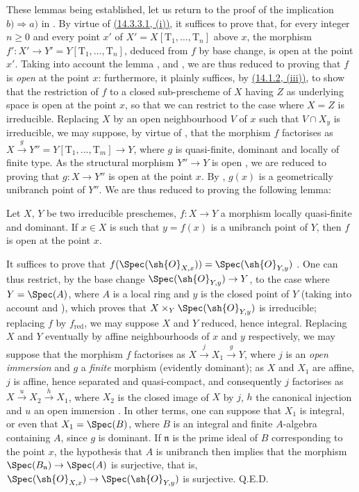 These lemmas being established, let us return to the proof of the implication $b)\Rightarrow a)$ in .
By virtue of \hyperref[IV.14.3.3.1]{(14.3.3.1, (i))}, it suffices to prove that, for every integer $n\geq 0$ and every point $x'$ of $X'=X[\mathrm{T}_1,\ldots,\mathrm{T}_n]$ above $x$, the morphism
$f':X'\to Y'=Y[\mathrm{T}_1,\ldots,\mathrm{T}_n]$, deduced from $f$ by base change, is open at the point $x'$.
Taking into account the lemma ,  and , we are thus reduced to proving that $f$ is \emph{open} at the point $x$: furthermore, it plainly suffices, by \hyperref[IV.14.1.2]{(14.1.2, (iii))}, to show that the restriction of $f$ to a closed sub-prescheme of $X$ having $Z$ as underlying space is open at the point $x$, so that we can restrict to the case where $X=Z$ is irreducible.
Replacing $X$ by an open neighbourhood $V$ of $x$ such that $V\cap X_y$ is irreducible, we may suppose, by virtue of , that the morphism $f$ factorises as $X\xrightarrow{g}Y''=Y[\mathrm{T}_1,\ldots,\mathrm{T}_m]\to Y$, where $g$ is quasi-finite, dominant and locally of finite type.
As the structural morphism $Y''\to Y$ is open , we are reduced to proving that $g:X\to Y''$ is open at the point $x$.
By , $g(x)$ is a geometrically unibranch point of $Y''$.
We are thus reduced to proving the following lemma:

\begin{lemma}[14.4.1.3]
\label{IV.14.4.1.3}
Let $X$, $Y$ be two irreducible preschemes, $f:X\to Y$ a morphism locally quasi-finite and dominant.
If $x\in X$ is such that $y=f(x)$ is a unibranch point of $Y$, then $f$ is open at the point $x$.
\end{lemma}

It suffices to prove that $f(\Spec(\sh{O}_{X,x}))=\Spec(\sh{O}_{Y,y})$ .
One can thus restrict, by the base change $\Spec(\sh{O}_{Y,y})\to Y$, to the case where $Y=\Spec(A)$, where $A$ is a local ring and $y$ is the closed point of $Y$ (taking into account  and ), which proves that $X\times_Y\Spec(\sh{O}_{Y,y})$ is irreducible; replacing $f$ by $f_{\mathrm{red}}$, we may suppose $X$ and $Y$ reduced, hence integral.
Replacing $X$ and $Y$ eventually by affine neighbourhoods of $x$ and $y$ respectively, we may suppose  that the morphism $f$ factorises as $X\xrightarrow{j}X_1\xrightarrow{g}Y$, where $j$ is an \emph{open immersion} and $g$ a \emph{finite} morphism (evidently dominant); as $X$ and $X_1$ are affine, $j$ is affine, hence separated and quasi-compact, and consequently $j$ factorises as $X\xrightarrow{u}X_2\xrightarrow{h}X_1$, where $X_2$ is the closed image of $X$ by $j$, $h$ the canonical injection and $u$ an open immersion .
In other terms, one can suppose that $X_1$ is integral, or even that $X_1=\Spec(B)$, where $B$ is an integral and finite $A$-algebra containing $A$, since $g$ is dominant. If $\mathfrak{n}$ is the prime ideal of $B$ corresponding to the point $x$, the hypothesis that $A$ is unibranch then implies  that the morphism $\Spec(B_\mathfrak{n})\to\Spec(A)$ is surjective, that is, $\Spec(\sh{O}_{X,x})\to\Spec(\sh{O}_{Y,y})$ is surjective.
Q.E.D.

